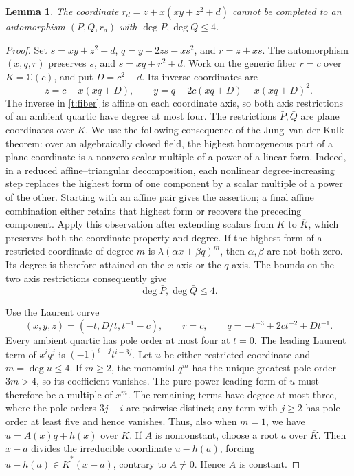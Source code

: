\documentclass[11pt,reqno]{amsart}
\numberwithin{equation}{section}
\theoremstyle{plain}
\newtheorem{lemma}[theorem]{Lemma}
\theoremstyle{definition}
\theoremstyle{remark}
\newcommand{\C}{\mathbb C}
\begin{document}
\begin{lemma}\label{t:nagata}
The coordinate $r_d=z+x(xy+z^2+d)$ cannot be completed to an automorphism
$(P,Q,r_d)$ with $\deg P,\deg Q\le4$.
\end{lemma}
\begin{proof}
Set $s=xy+z^2+d$, $q=y-2zs-xs^2$, and $r=z+xs$.
The automorphism $(x,q,r)$ preserves $s$, and $s=xq+r^2+d$.
Work on the generic fiber $r=c$ over $K=\C(c)$, and put $D=c^2+d$.
Its inverse coordinates are
\begin{equation}\label{t:fiber}
 z=c-x(xq+D),\qquad y=q+2c(xq+D)-x(xq+D)^2.
\end{equation}
The inverse in \eqref{t:fiber} is affine on each coordinate axis, so both
axis restrictions of an ambient quartic have degree at most four.
The restrictions $\bar P,\bar Q$ are plane coordinates over $K$.
We use the following consequence of the Jung--van der Kulk theorem:
over an algebraically closed field, the highest homogeneous part of a
plane coordinate is a nonzero scalar multiple of a power of a linear
form. Indeed, in a reduced affine--triangular decomposition, each
nonlinear degree-increasing step replaces the highest form of one
component by a scalar multiple of a power of the other. Starting with
an affine pair gives the assertion; a final affine combination either
retains that highest form or recovers the preceding component.
Apply this observation after extending scalars from $K$ to $\overline K$,
which preserves both the coordinate property and degree. If the highest
form of a restricted coordinate of degree $m$ is
$\lambda(\alpha x+\beta q)^m$, then $\alpha,\beta$ are not both zero.
Its degree is therefore attained on the $x$-axis or the $q$-axis.
The bounds on the two axis restrictions consequently give
\begin{equation}\label{t:fiberdegree}
 \deg\bar P,\deg\bar Q\le4.
\end{equation}

Use the Laurent curve
\[
 (x,y,z)=(-t,D/t,t^{-1}-c),\qquad r=c,\qquad
 q=-t^{-3}+2ct^{-2}+Dt^{-1}.
\]
Every ambient quartic has pole order at most four at $t=0$.
The leading Laurent term of $x^iq^j$ is $(-1)^{i+j}t^{i-3j}$.
Let $u$ be either restricted coordinate and $m=\deg u\le4$.
If $m\ge2$, the monomial $q^m$ has the unique greatest pole order $3m>4$,
so its coefficient vanishes. The pure-power leading form of $u$ must
therefore be a multiple of $x^m$. The remaining terms have degree at most
three, where the pole orders $3j-i$ are pairwise distinct; any term with
$j\ge2$ has pole order at least five and hence vanishes.
Thus, also when $m=1$, we have $u=A(x)q+h(x)$ over $K$.
If $A$ is nonconstant, choose a root $a$ over $\overline K$.
Then $x-a$ divides the irreducible coordinate $u-h(a)$, forcing
$u-h(a)\in\overline K^*(x-a)$, contrary to $A\ne0$.
Hence $A$ is constant.


\end{proof}
\end{document}
